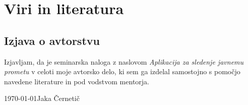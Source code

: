 \documentclass[12pt]{article}
\begin{document}
\newpage
\begingroup
\makeatletter
\section{Viri in literatura}
\nocite{*}
\printbibliography[heading=none]
\makeatother
\endgroup

\newpage
\begin{samepage}
    \thispagestyle{empty}
    \section*{Izjava o avtorstvu}
    Izjavljam, da je seminarska naloga z naslovom \textit{Aplikacija za sledenje javnemu prometu} v celoti moje avtorsko delo, ki sem ga izdelal samostojno s pomočjo navedene literature in pod vodstvom mentorja.

    \vfill

    \today \hfill Jaka Černetič
    \vspace{3cm}
\end{samepage}
\end{document}
